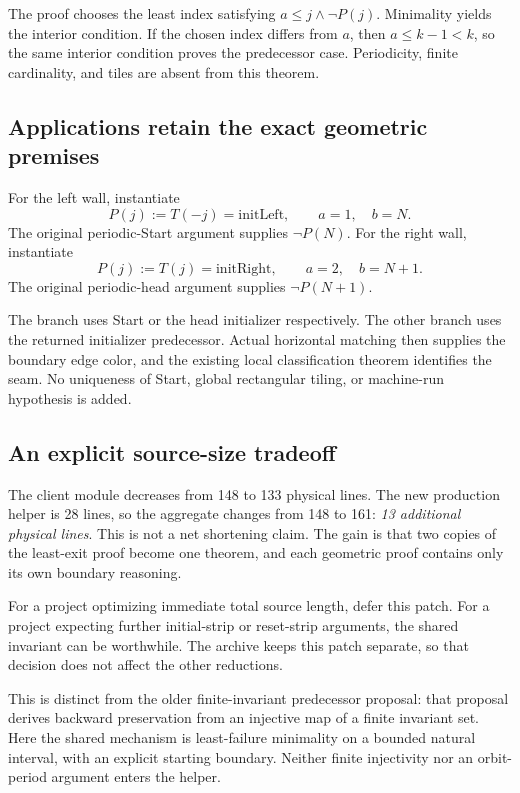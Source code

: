 The proof chooses the least index satisfying \(a\le j\land\neg P(j)\).
Minimality yields the interior condition. If the chosen index differs from
\(a\), then \(a\le k-1<k\), so the same interior condition proves the
predecessor case. Periodicity, finite cardinality, and tiles are absent
from this theorem.

\subsection{Applications retain the exact geometric premises}

For the left wall, instantiate
\[
P(j):=T(-j)=\mathrm{initLeft},\qquad a=1,\quad b=N.
\]
The original periodic-Start argument supplies \(\neg P(N)\). For the
right wall, instantiate
\[
P(j):=T(j)=\mathrm{initRight},\qquad a=2,\quad b=N+1.
\]
The original periodic-head argument supplies \(\neg P(N+1)\).

The  branch uses Start or the head initializer respectively.
The other branch uses the returned initializer predecessor. Actual
horizontal matching then supplies the boundary edge color, and the
existing local classification theorem identifies the seam. No uniqueness
of Start, global rectangular tiling, or machine-run hypothesis is added.

\subsection{An explicit source-size tradeoff}

The client module decreases from 148 to 133 physical lines. The new
production helper is 28 lines, so the aggregate changes from 148 to 161:
\emph{13 additional physical lines}. This is not a net shortening claim.
The gain is that two copies of the least-exit proof become one theorem,
and each geometric proof contains only its own boundary reasoning.

For a project optimizing immediate total source length, defer this patch.
For a project expecting further initial-strip or reset-strip arguments,
the shared invariant can be worthwhile. The archive keeps this patch
separate, so that decision does not affect the other reductions.

This is distinct from the older finite-invariant predecessor proposal:
that proposal derives backward preservation from an injective map of a
finite invariant set. Here the shared mechanism is least-failure
minimality on a bounded natural interval, with an explicit starting
boundary. Neither finite injectivity nor an orbit-period argument enters
the helper.
